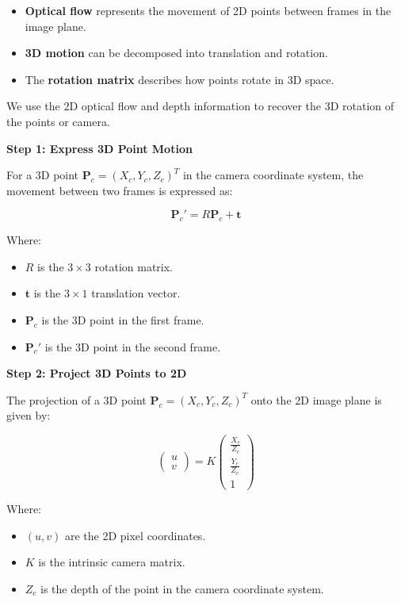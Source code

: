 \begin{itemize}
	\item \textbf{Optical flow} represents the movement of 2D points between frames in the image plane.
	\item \textbf{3D motion} can be decomposed into translation and rotation.
	\item The \textbf{rotation matrix} describes how points rotate in 3D space.
\end{itemize}

We use the 2D optical flow and depth information to recover the 3D rotation of the points or camera.

\textbf{Step 1: Express 3D Point Motion}

For a 3D point \( \mathbf{P}_c = (X_c, Y_c, Z_c)^T \) in the camera coordinate system, the movement between two frames is expressed as:

\[
\mathbf{P}_c' = R \mathbf{P}_c + \mathbf{t}
\]

Where:
\begin{itemize}
	\item \( R \) is the \( 3 \times 3 \) rotation matrix.
	\item \( \mathbf{t} \) is the \( 3 \times 1 \) translation vector.
	\item \( \mathbf{P}_c \) is the 3D point in the first frame.
	\item \( \mathbf{P}_c' \) is the 3D point in the second frame.
\end{itemize}

\textbf{Step 2: Project 3D Points to 2D}

The projection of a 3D point \( \mathbf{P}_c = (X_c, Y_c, Z_c)^T \) onto the 2D image plane is given by:

\[
\begin{pmatrix} u \\ v \end{pmatrix} = K \begin{pmatrix} \frac{X_c}{Z_c} \\ \frac{Y_c}{Z_c} \\ 1 \end{pmatrix}
\]

Where:
\begin{itemize}
	\item \( (u, v) \) are the 2D pixel coordinates.
	\item \( K \) is the intrinsic camera matrix.
	\item \( Z_c \) is the depth of the point in the camera coordinate system.
\end{itemize}

